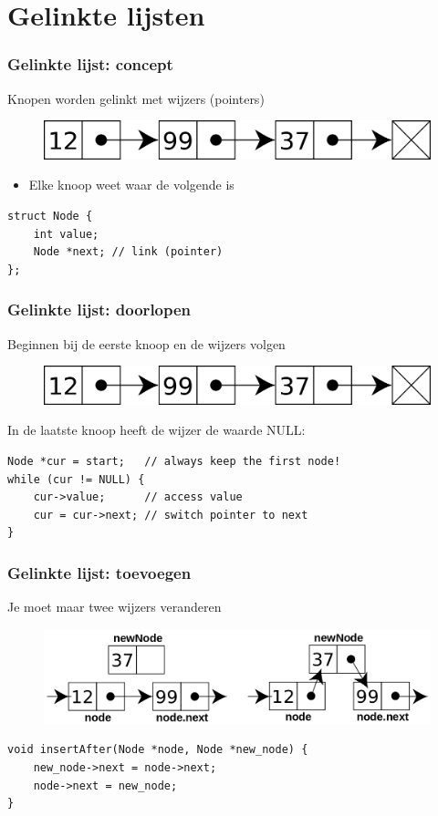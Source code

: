 \documentclass[12pt]{beamer}
\begin{document}
\section{Gelinkte lijsten}

\begin{frame}[fragile]
\frametitle{Gelinkte lijst: concept}
Knopen worden gelinkt met wijzers (pointers)
\begin{figure}
\centering
\includegraphics[width=.8\textwidth]{img/singly-linked}
\end{figure}
\begin{itemize}
\item Elke knoop weet waar de volgende is
\end{itemize}
\begin{lstlisting}
struct Node {
    int value;
    Node *next; // link (pointer)
};
\end{lstlisting}
\end{frame}

\begin{frame}[fragile]
\frametitle{Gelinkte lijst: doorlopen}
Beginnen bij de eerste knoop en de wijzers volgen
\begin{figure}
\centering
\includegraphics[width=.6\textwidth]{img/singly-linked}
\end{figure}
In de laatste knoop heeft de wijzer de waarde NULL:
\begin{lstlisting}
Node *cur = start;   // always keep the first node!
while (cur != NULL) {
    cur->value;      // access value
    cur = cur->next; // switch pointer to next
}
\end{lstlisting}
\end{frame}

\begin{frame}[fragile]
\frametitle{Gelinkte lijst: toevoegen}
Je moet maar twee wijzers veranderen
\begin{figure}
\centering
\includegraphics[width=.9\textwidth]{img/insert-node}
\end{figure}
\begin{lstlisting}
void insertAfter(Node *node, Node *new_node) {
    new_node->next = node->next;
    node->next = new_node;
}
\end{lstlisting}
\end{frame}
\end{document}
